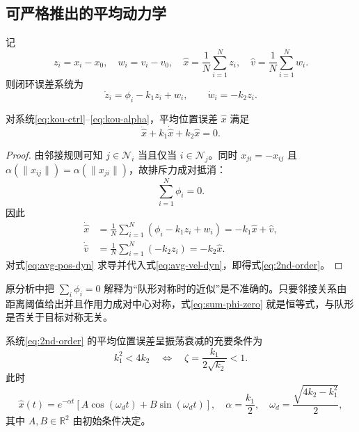 \subsection{可严格推出的平均动力学}

记
\begin{equation}
z_i=x_i-x_0,\quad w_i=v_i-v_0,\quad
\hat{x}=\frac{1}{N}\sum_{i=1}^N z_i,\quad
\hat{v}=\frac{1}{N}\sum_{i=1}^N w_i .
\end{equation}
则闭环误差系统为
\begin{equation}
\dot{z}_i=\phi_i-k_1z_i+w_i,\qquad \dot{w}_i=-k_2z_i. \label{eq:kou-error-dyn}
\end{equation}

\begin{theorem}[平均误差动力学]
对系统\eqref{eq:kou-ctrl}--\eqref{eq:kou-alpha}，平均位置误差 $\hat{x}$ 满足
\begin{equation}
\ddot{\hat{x}}+k_1\dot{\hat{x}}+k_2\hat{x}=0. \label{eq:2nd-order}
\end{equation}
\end{theorem}

\begin{proof}
由邻接规则可知 $j\in\mathcal{N}_i$ 当且仅当 $i\in\mathcal{N}_j$。同时 $x_{ji}=-x_{ij}$ 且 $\alpha(\|x_{ij}\|)=\alpha(\|x_{ji}\|)$，故排斥力成对抵消：
\begin{equation}
\sum_{i=1}^N\phi_i=0. \label{eq:sum-phi-zero}
\end{equation}
因此
\begin{align}
\dot{\hat{x}}
&=\frac{1}{N}\sum_{i=1}^N(\phi_i-k_1z_i+w_i)
=-k_1\hat{x}+\hat{v}, \label{eq:avg-pos-dyn}\\
\dot{\hat{v}}
&=\frac{1}{N}\sum_{i=1}^N(-k_2z_i)
=-k_2\hat{x}. \label{eq:avg-vel-dyn}
\end{align}
对式\eqref{eq:avg-pos-dyn} 求导并代入式\eqref{eq:avg-vel-dyn}，即得式\eqref{eq:2nd-order}。
\end{proof}

\begin{remark}
原分析中把 $\sum_i\phi_i=0$ 解释为“队形对称时的近似”是不准确的。只要邻接关系由距离阈值给出并且作用力成对中心对称，式\eqref{eq:sum-phi-zero} 就是恒等式，与队形是否关于目标对称无关。
\end{remark}

\begin{theorem}[平均误差的振荡条件]
系统\eqref{eq:2nd-order} 的平均位置误差呈振荡衰减的充要条件为
\begin{equation}
k_1^2<4k_2
\quad\Longleftrightarrow\quad
\zeta=\frac{k_1}{2\sqrt{k_2}}<1 .
\end{equation}
此时
\begin{equation}
\hat{x}(t)=e^{-\alpha t}\left[A\cos(\omega_dt)+B\sin(\omega_dt)\right],
\quad
\alpha=\frac{k_1}{2},\quad
\omega_d=\frac{\sqrt{4k_2-k_1^2}}{2},
\end{equation}
其中 $A,B\in\mathbb{R}^2$ 由初始条件决定。
\end{theorem}

